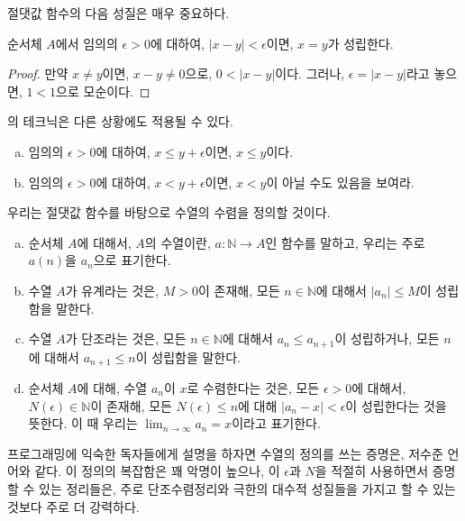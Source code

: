 절댓값 함수의 다음 성질은 매우 중요하다.
\begin{lemma}
\label{lem:epsroom}
    순서체 $A$에서 임의의 $\epsilon > 0$에 대하여, $|x - y| < \epsilon$이면, $x = y$가 성립한다.
\end{lemma}
\begin{proof}
    만약 $x \neq y$이면, $x - y \neq 0$으로, $0 < |x - y|$이다.
    그러나, $\epsilon = |x - y|$라고 놓으면, $1 < 1$으로 모순이다.
\end{proof}
\begin{exercise}
    의 테크닉은 다른 상황에도 적용될 수 있다.
    \begin{enumerate}[(a)]
        \item 임의의 $\epsilon > 0$에 대하여, $x \leq y + \epsilon$이면, $x \leq y$이다.
        \item 임의의 $\epsilon > 0$에 대하여, $x < y + \epsilon$이면, $x < y$이 아닐 수도 있음을 보여라.
    \end{enumerate}
\end{exercise}
우리는 절댓값 함수를 바탕으로 수열의 수렴을 정의할 것이다.
\begin{definition}
\label{def:seqconverge}
    \begin{enumerate}[(a)]
        \item 순서체 $A$에 대해서, $A$의 수열이란, $a: \mathbb{N} \to A$인 함수를 말하고, 우리는 주로 $a(n)$을 $a_n$으로 표기한다.
        \item 수열 $A$가 유계라는 것은, $M > 0$이 존재해, 모든 $n \in \mathbb{N}$에 대해서 $|a_n| \leq M$이 성립함을 말한다.
        \item 수열 $A$가 단조라는 것은, 모든 $n \in \mathbb{N}$에 대해서 $a_n \leq a_{n + 1}$이 성립하거나, 모든 $n$에 대해서 $a_{n + 1} \leq n$이 성립함을 말한다.
        \item 순서체 $A$에 대해, 수열 $a_n$이 $x$로 수렴한다는 것은, 모든 $\epsilon > 0$에 대해서, $N(\epsilon) \in \mathbb{N}$이 존재해, 모든 $N(\epsilon) \leq n$에 대해 $|a_n - x| < \epsilon$이 성립한다는 것을 뜻한다.
        이 때 우리는 $\lim_{n \to \infty} a_n = x$이라고 표기한다.
    \end{enumerate}
\end{definition}
\begin{remark}
    프로그래밍에 익숙한 독자들에게 설명을 하자면 수열의 정의를 쓰는 증명은, 저수준 언어와 같다.
    이 정의의 복잡함은 꽤 악명이 높으나, 이 $\epsilon$과 $N$을 적절히 사용하면서 증명할 수 있는 정리들은, 주로 단조수렴정리와 극한의 대수적 성질들을 가지고 할 수 있는 것보다 주로 더 강력하다.
\end{remark}

